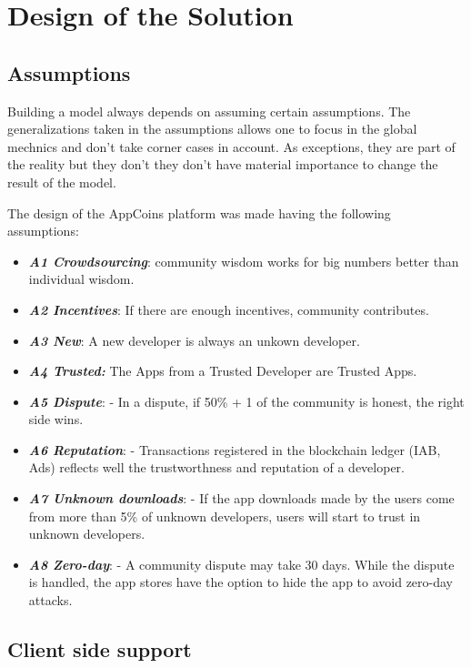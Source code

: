 \section{Design of the Solution}

\label{sec:design}


\subsection{Assumptions }


Building a model always depends on assuming certain assumptions. The generalizations taken in the assumptions allows one to focus in the global mechnics and don't take corner cases in account. As exceptions, they are part of the reality but they don't they don't have material importance to change the result of the model.

The design of the AppCoins platform was made having the following assumptions:

\begin{itemize}
\item {\bf\em A1 Crowdsourcing}: community wisdom works for big numbers better than individual wisdom\cite{Surowiecki:2005:WC:1095645}.
\item {\bf\em A2 Incentives}: If there are enough incentives, community contributes.
\item {\bf\em A3 New}: A new developer is always an unkown developer.
\item {\bf\em A4 Trusted:} The Apps from a Trusted Developer are Trusted Apps.
\item {\bf\em A5 Dispute}: - In a dispute, if 50\% + 1 of the community is honest, the right side wins.
\item {\bf\em A6 Reputation}: - Transactions registered in the blockchain ledger (IAB, Ads) reflects well the trustworthness and reputation of a developer.
\item {\bf\em A7 Unknown downloads}: - If the app downloads made by the users come from more than 5\% of unknown developers, users will start to trust in unknown developers.
\item {\bf\em A8 Zero-day}: - A community dispute may take 30 days. While the dispute is handled, the app stores have the option to hide the app to avoid zero-day attacks.
\end{itemize}



\subsection{Client side support}

